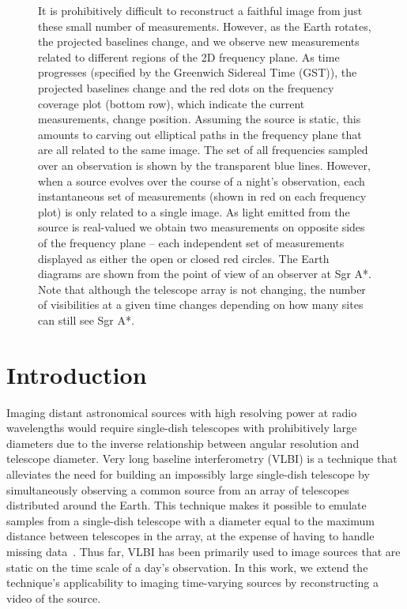 \begin{figure}[h!]
\begin{center}
{			%
			It is prohibitively difficult to reconstruct a faithful image from just these small number of measurements. 
			However, as the Earth rotates, the projected baselines change, and we observe new measurements related to different regions of the 2D frequency plane. 
			As time progresses (specified by the Greenwich Sidereal Time (GST)), the projected baselines change and the red dots on the frequency coverage plot (bottom row), which indicate the current measurements, change position. 
			Assuming the source is static, this amounts to carving out elliptical paths in the frequency plane that are all related to the same image. The set of all frequencies sampled over an observation is shown by the transparent blue lines. However, when a source evolves over the course of a night's observation, each instantaneous set of measurements (shown in red on each frequency plot) is only related to a single image.
			As light emitted from the source is real-valued we obtain two measurements on opposite sides of the frequency plane -- each independent set of measurements displayed as either the open or closed red circles. The Earth diagrams are shown from the point of view of an observer at Sgr A*. Note that although the telescope array is not changing, the number of visibilities at a given time changes depending on how many sites can still see Sgr A*. 
		} 
		\label{fig:earthrotationsythesis}
	\end{center}
	\vspace{-.1in}
\end{figure}


\vspace{-.1in}
\section{Introduction}

Imaging distant astronomical sources with high resolving power at radio wavelengths would require single-dish telescopes with prohibitively large diameters due to the inverse relationship between angular resolution and telescope diameter. Very long baseline interferometry (VLBI) is a technique that alleviates the need for building an impossibly large single-dish telescope by simultaneously observing a common source from an array of telescopes distributed around the Earth. This technique makes it possible to emulate samples from a single-dish telescope with a diameter equal to the maximum distance between telescopes in the array, at the expense of having to handle missing data~\cite{TMS}. Thus far, VLBI has been primarily used to image sources that are static on the time scale of a day's observation. In this work, we extend the technique's applicability to imaging time-varying sources by reconstructing a video of the source. %

